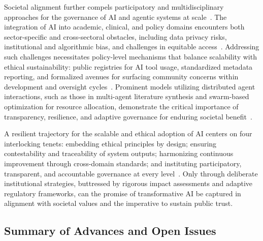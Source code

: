 \documentclass[sigconf]{acmart}
\begin{document}
Societal alignment further compels participatory and multidisciplinary approaches for the governance of AI and agentic systems at scale~\cite{ref1,ref3,ref7,ref10,ref13,ref15,ref22,ref23,ref24,ref25,ref26,ref27,ref29,ref31,ref34,ref35,ref42,ref43,ref44,ref45,ref46,ref47,ref48,ref49,ref50,ref51,ref52,ref53,ref54,ref55,ref56,ref57,ref60,ref64,ref65,ref76,ref78,ref80,ref86,ref87,ref88,ref89,ref90,ref91,ref92,ref93,ref94,ref95,ref96,ref97,ref98,ref100,ref101,ref102,ref103,ref104,ref105,ref106,ref109,ref110,ref111,ref112,ref113,ref114,ref115,ref117}. The integration of AI into academic, clinical, and policy domains encounters both sector-specific and cross-sectoral obstacles, including data privacy risks, institutional and algorithmic bias, and challenges in equitable access~\cite{ref90,ref94,ref96,ref97,ref100,ref106}. Addressing such challenges necessitates policy-level mechanisms that balance scalability with ethical sustainability: public registries for AI tool usage, standardized metadata reporting, and formalized avenues for surfacing community concerns within development and oversight cycles~\cite{ref95,ref106,ref110,ref113}. Prominent models utilizing distributed agent interactions, such as those in multi-agent literature synthesis and swarm-based optimization for resource allocation, demonstrate the critical importance of transparency, resilience, and adaptive governance for enduring societal benefit~\cite{ref31,ref34,ref35,ref47,ref49,ref55}.

A resilient trajectory for the scalable and ethical adoption of AI centers on four interlocking tenets: embedding ethical principles by design; ensuring contestability and traceability of system outputs; harmonizing continuous improvement through cross-domain standards; and instituting participatory, transparent, and accountable governance at every level~\cite{ref74,ref75,ref80,ref84,ref95,ref96,ref97,ref98,ref100,ref102,ref104,ref106,ref109,ref110}. Only through deliberate institutional strategies, buttressed by rigorous impact assessments and adaptive regulatory frameworks, can the promise of transformative AI be captured in alignment with societal values and the imperative to sustain public trust.

\subsection{Summary of Advances and Open Issues}
\end{document}
